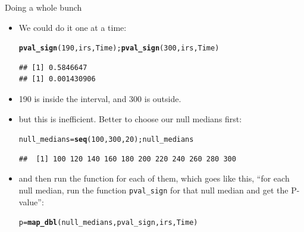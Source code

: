 \documentclass[unknownkeysallowed]{beamer}\usepackage[]{graphicx}\usepackage[]{color}
\makeatletter
\newcommand{\hlnum}[1]{\textcolor[rgb]{0.686,0.059,0.569}{#1}}%
\newcommand{\hlstd}[1]{\textcolor[rgb]{0.345,0.345,0.345}{#1}}%
\newcommand{\hlkwb}[1]{\textcolor[rgb]{0.69,0.353,0.396}{#1}}%
\newcommand{\hlkwd}[1]{\textcolor[rgb]{0.737,0.353,0.396}{\textbf{#1}}}%
\newenvironment{kframe}{%
 \def\at@end@of@kframe{}%
 \ifinner\ifhmode%
  \def\at@end@of@kframe{\end{minipage}}%
  \begin{minipage}{\columnwidth}%
 \fi\fi%
 \def\FrameCommand##1{\hskip\@totalleftmargin \hskip-\fboxsep
 \colorbox{shadecolor}{##1}\hskip-\fboxsep
     \hskip-\linewidth \hskip-\@totalleftmargin \hskip\columnwidth}%
 \MakeFramed {\advance\hsize-\width
   \@totalleftmargin\z@ \linewidth\hsize
   \@setminipage}}%
 {\par\unskip\endMakeFramed%
 \at@end@of@kframe}
\newenvironment{knitrout}{}{} %
\makeatother
\begin{document}
\begin{frame}[fragile]{Doing a whole bunch}
  
  \begin{itemize}
  \item We could do it one at a time:
    
\begin{knitrout}
\color{fgcolor}\begin{kframe}
\begin{alltt}
\hlkwd{pval_sign}\hlstd{(}\hlnum{190}\hlstd{,irs,Time) ;} \hlkwd{pval_sign}\hlstd{(}\hlnum{300}\hlstd{,irs,Time)}
\end{alltt}
\begin{verbatim}
## [1] 0.5846647
## [1] 0.001430906
\end{verbatim}
\end{kframe}
\end{knitrout}
\item 190 is inside the interval, and 300 is outside.
\item but this is inefficient. Better to choose our null medians first:
\begin{knitrout}
\color{fgcolor}\begin{kframe}
\begin{alltt}
\hlstd{null_medians}\hlkwb{=}\hlkwd{seq}\hlstd{(}\hlnum{100}\hlstd{,}\hlnum{300}\hlstd{,}\hlnum{20}\hlstd{) ; null_medians}
\end{alltt}
\begin{verbatim}
##  [1] 100 120 140 160 180 200 220 240 260 280 300
\end{verbatim}
\end{kframe}
\end{knitrout}
\item and then run the function for each of them, which goes like
  this, ``for each null median, run the function \texttt{pval\_sign} for
  that null median and get the P-value'':
  
\begin{knitrout}
\color{fgcolor}\begin{kframe}
\begin{alltt}
\hlstd{p}\hlkwb{=}\hlkwd{map_dbl}\hlstd{(null_medians,pval_sign,irs,Time)}
\end{alltt}
\end{kframe}
\end{knitrout}
  
  
  \end{itemize}
  
\end{frame}
\end{document}
